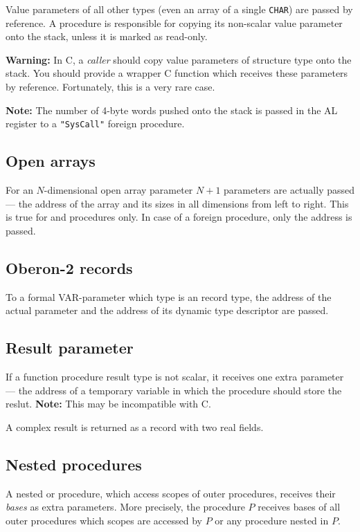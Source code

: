 Value parameters of all other types (even an array of a single \verb'CHAR')
are passed by reference. A procedure is responsible for copying its non-scalar
value parameter onto the stack, unless it is marked as read-only.

{\bf Warning:} In C, a {\em caller} should copy value parameters of
structure type onto the stack. You should provide a wrapper C function
which receives these parameters by reference. Fortunately, this is
a very rare case.

{\bf Note:} The number of 4-byte words pushed onto the stack is
passed in the AL register to a \verb'"SysCall"' foreign procedure.

\subsection{Open arrays}

For an $N$-dimensional open array parameter $N+1$ parameters are
actually passed --- the address of the array and its sizes in
all dimensions from left to right. This is true for \mt{} and
\ot{} procedures only. In case of a foreign procedure,
only the address is passed.

\subsection{Oberon-2 records}

To a formal VAR-parameter which type is an \ot{} record type,
the address of the actual parameter and the address of its dynamic type
descriptor are passed.

\subsection{Result parameter}
\label{lowlevel:conv:result}

If a function procedure result type is not scalar, it receives one extra
parameter --- the address of a temporary variable in which the
procedure should store the reslut. {\bf Note:} This may be incompatible with C.

A complex result is returned as a record with two real fields.

\subsection{Nested procedures}
\label{lowlevel:conv:nested}

A nested \mt{} or \ot{} procedure, which access scopes of outer
procedures, receives their {\em bases} as extra parameters.
More precisely, the procedure $P$ receives bases of all outer procedures
which scopes are accessed by $P$ or any procedure nested in $P$.

